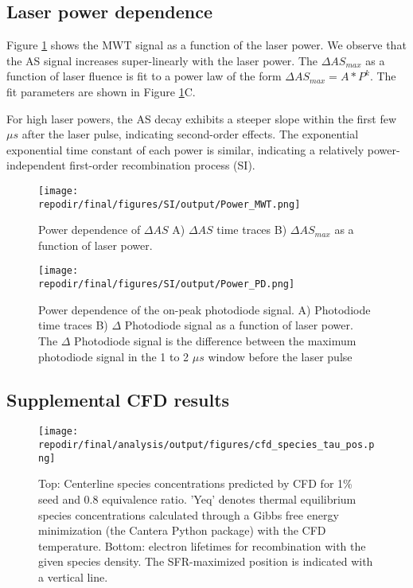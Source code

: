 \subsection{Laser power dependence}

Figure \ref{fig:SI_power_dependence_AS} shows the MWT signal as a function of the laser power. We observe that the AS signal increases super-linearly with the laser power. The $\Delta AS_{max}$ as a function of laser fluence is fit to a power law of the form $\Delta AS_{max} = A * P^k$. The fit parameters are shown in Figure \ref{fig:SI_power_dependence_AS}C.

For high laser powers, the AS decay exhibits a steeper slope within the first few $\mu s$ after the laser pulse, indicating second-order effects. The exponential exponential time constant of each power is similar, indicating a relatively power-independent first-order recombination process (SI).

\begin{figure}[h]
    \texttt{[image: \\repodir/final/figures/SI/output/Power\_MWT.png]} 
    \caption{Power dependence of $\Delta AS$ A) $\Delta AS$ time traces B) $\Delta AS_{max}$ as a function of laser power. }
    \label{fig:SI_power_dependence_AS}
\end{figure}



\begin{figure}[h]
    \texttt{[image: \\repodir/final/figures/SI/output/Power\_PD.png]} 
    \caption{Power dependence of the on-peak photodiode signal. A) Photodiode time traces B) $\Delta$ Photodiode signal as a function of laser power. The $\Delta$ Photodiode signal is the difference between the maximum photodiode signal in the 1 to 2 $\mu s$ window before the laser pulse}
    \label{fig:SI_power_dependence_PD}
\end{figure}

\clearpage

\subsection{Supplemental CFD results}

\begin{figure}[h]
    \texttt{[image: \\repodir/final/analysis/output/figures/cfd\_species\_tau\_pos.png]} 
    \caption{Top: Centerline species concentrations predicted by CFD for 1\% seed and 0.8 equivalence ratio. 'Yeq' denotes thermal equilibrium species concentrations calculated through a Gibbs free energy minimization (the Cantera Python package) with the CFD temperature.  Bottom:   
    electron lifetimes for recombination with the given species density. The SFR-maximized position is indicated with a vertical line.}
    \label{fig:SI_cfd_species_tau_pos}
\end{figure}

